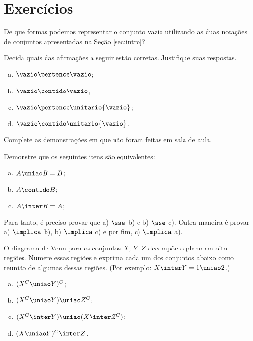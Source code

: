 \section{Exercícios}

\begin{exercise}
  \label{exe:vazio-notacao}
	De que formas podemos representar o conjunto vazio utilizando as duas notações de conjuntos apresentadas na Seção \ref{sec:intro}?
\end{exercise}

\begin{exercise}
  \label{exe:vazios-tricky}
	Decida quais das afirmações a seguir estão corretas. Justifique suas respostas.
	\begin{enumerate}[a)]
		\item $\vazio \pertence \vazio$;
		\item $\vazio \contido \vazio$;
		\item $\vazio \pertence \unitario{\vazio}$;
		\item $\vazio \contido \unitario{\vazio}$.
	\end{enumerate}
\end{exercise}

\begin{exercise}
  Complete as demonstrações em  que não foram feitas em sala de aula.
\end{exercise}

\begin{exercise}
  Demonstre que os seguintes itens são equivalentes:
    \begin{enumerate}[a)]
      \item $A \uniao B = B$;
      \item $A \contido B$;
      \item $A \inter B = A$;
    \end{enumerate}
    \begin{hint}
      Para tanto, é preciso provar que a) $\sse$ b) e b) $\sse$ c). Outra maneira é provar a) $\implica$ b), b) $\implica$ c) e por fim, c) $\implica$ a).
    \end{hint}
\end{exercise}

\begin{exercise}
  O diagrama de Venn para os conjuntos $X$, $Y$, $Z$ decompõe o plano em oito regiões. Numere essas regiões e exprima cada um dos conjuntos abaixo como reunião de algumas dessas regiões. (Por exemplo: $X \inter Y = 1 \uniao 2$.)
  \begin{enumerate}[a)]
    \item $(X^C \uniao Y)^C$;
    \item $(X^C \uniao Y) \uniao Z^C$;
    \item $(X^C \inter Y) \uniao (X \inter Z^C)$;
    \item $(X \uniao Y)^C \inter Z$.
  \end{enumerate}
\end{exercise}

